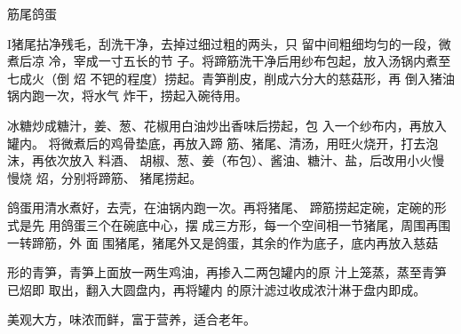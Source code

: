 \begin{recipe}[筋鞭鸽蛋]{筋尾鸽蛋}

\ingredients


\preparation

I猪尾拈净残毛，刮洗干净，去掉过细过粗的两头，只 留中间粗细均匀的一段，微煮后凉
冷，宰成一寸五长的节 子。将蹄筋洗干净后用纱布包起，放入汤锅内煮至七成火（倒 炤
不钯的程度）捞起。青笋削皮，削成六分大的慈菇形，再 倒入猪油锅内跑一次，将水气
炸干，捞起入碗待用。

冰糖炒成糖汁，姜、葱、花椒用白油炒出香味后捞起，包 入一个纱布内，再放入罐内。
将微煮后的鸡骨垫底，再放入蹄 筋、猪尾、清汤，用旺火烧开，打去泡沫，再依次放入
料酒、 胡椒、葱、姜（布包）、酱油、糖汁、盐，后改用小火慢慢烧 炤，分别将蹄筋、
猪尾捞起。

鸽蛋用清水煮好，去壳，在油锅内跑一次。再将猪尾、 蹄筋捞起定碗，定碗的形式是先
用鸽蛋三个在碗底中心，摆 成三方形，每一个空间相一节猪尾，周围再围一转蹄筋，外
面 围猪尾，猪尾外又是鸽蛋，其余的作为底子，底内再放入慈菇

形的青笋，青笋上面放一两生鸡油，再掺入二两包罐内的原 汁上笼蒸，蒸至青笋已炤即
取出，翻入大圆盘内，再将罐内 的原汁滤过收成浓汁淋于盘内即成。

\features

美观大方，味浓而鲜，富于营养，适合老年。

\end{recipe}

